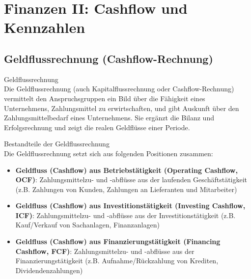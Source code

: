 \raggedcolumns

\section{Finanzen II: Cashflow und Kennzahlen}

\subsection{Geldflussrechnung (Cashflow-Rechnung)}

\begin{definition}{Geldflussrechnung}\\
Die Geldflussrechnung (auch Kapitalflussrechnung oder Cashflow-Rechnung) vermittelt den Anspruchsgruppen ein Bild über die Fähigkeit eines Unternehmens, Zahlungsmittel zu erwirtschaften, und gibt Auskunft über den Zahlungsmittelbedarf eines Unternehmens. Sie ergänzt die Bilanz und Erfolgsrechnung und zeigt die realen Geldflüsse einer Periode.
\end{definition}

\begin{definition}{Bestandteile der Geldflussrechnung}\\
Die Geldflussrechnung setzt sich aus folgenden Positionen zusammen:
\begin{itemize}
    \item \textbf{Geldfluss (Cashflow) aus Betriebstätigkeit (Operating Cashflow, OCF)}: Zahlungsmittelzu- und -abflüsse aus der laufenden Geschäftstätigkeit (z.B. Zahlungen von Kunden, Zahlungen an Lieferanten und Mitarbeiter)
    \item \textbf{Geldfluss (Cashflow) aus Investitionstätigkeit (Investing Cashflow, ICF)}: Zahlungsmittelzu- und -abflüsse aus der Investitionstätigkeit (z.B. Kauf/Verkauf von Sachanlagen, Finanzanlagen)
    \item \textbf{Geldfluss (Cashflow) aus Finanzierungstätigkeit (Financing Cashflow, FCF)}: Zahlungsmittelzu- und -abflüsse aus der Finanzierungstätigkeit (z.B. Aufnahme/Rückzahlung von Krediten, Dividendenzahlungen)
\end{itemize}
\end{definition}

